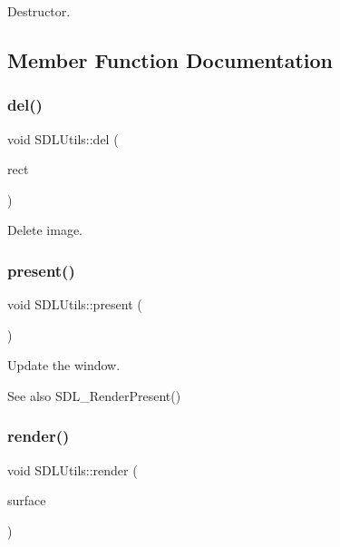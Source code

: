 Destructor. 



\subsection{Member Function Documentation}
\mbox{\label{class_s_d_l_utils_a8dfdc8f41938c2c53ac5121c10eb1638}} 
\subsubsection{\texorpdfstring{del()}{del()}}
{\footnotesize\ttfamily void S\+D\+L\+Utils\+::del (\begin{DoxyParamCaption}\item[{S\+D\+L\+\_\+\+Rect}]{rect }\end{DoxyParamCaption})\hspace{0.3cm}{\ttfamily [virtual]}}



Delete image. 

\mbox{\label{class_s_d_l_utils_a0e9c4b007ae61772a1c41592877b30ab}} 
\subsubsection{\texorpdfstring{present()}{present()}}
{\footnotesize\ttfamily void S\+D\+L\+Utils\+::present (\begin{DoxyParamCaption}{ }\end{DoxyParamCaption})\hspace{0.3cm}{\ttfamily [virtual]}}



Update the window. 

\begin{DoxySeeAlso}{See also}
S\+D\+L\+\_\+\+Render\+Present() 
\end{DoxySeeAlso}
\mbox{\label{class_s_d_l_utils_a8a30592df5e936b71f27283538e4cece}} 
\subsubsection{\texorpdfstring{render()}{render()}}
{\footnotesize\ttfamily void S\+D\+L\+Utils\+::render (\begin{DoxyParamCaption}\item[{\mbox{\hyperlink{class_i_surface}{I\+Surface}} $\ast$}]{surface }\end{DoxyParamCaption})\hspace{0.3cm}{\ttfamily [virtual]}}



